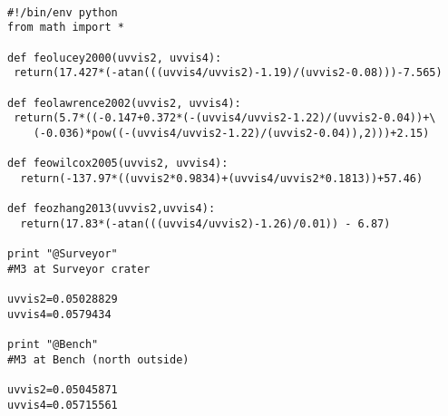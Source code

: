 \documentclass[preview=true]{standalone}
\begin{document}
\begin{verbatim}

#!/bin/env python
from math import *

def feolucey2000(uvvis2, uvvis4):
 return(17.427*(-atan(((uvvis4/uvvis2)-1.19)/(uvvis2-0.08)))-7.565)

def feolawrence2002(uvvis2, uvvis4):
 return(5.7*((-0.147+0.372*(-(uvvis4/uvvis2-1.22)/(uvvis2-0.04))+\
 	(-0.036)*pow((-(uvvis4/uvvis2-1.22)/(uvvis2-0.04)),2)))+2.15)

def feowilcox2005(uvvis2, uvvis4):
  return(-137.97*((uvvis2*0.9834)+(uvvis4/uvvis2*0.1813))+57.46)

def feozhang2013(uvvis2,uvvis4):
  return(17.83*(-atan(((uvvis4/uvvis2)-1.26)/0.01)) - 6.87)

print "@Surveyor"
#M3 at Surveyor crater

uvvis2=0.05028829
uvvis4=0.0579434

print "@Bench"
#M3 at Bench (north outside)

uvvis2=0.05045871
uvvis4=0.05715561

\end{verbatim}
\end{document}
